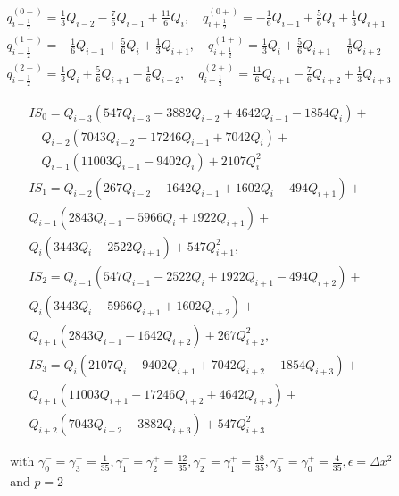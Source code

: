 \begin{equation}
\begin{array}{ll}
q_{i+\frac{1}{2}}^{(0-)}  =\frac{1}{3} Q_{i-2}-\frac{7}{6} Q_{i-1}+\frac{11}{6} Q_{i},\quad  q_{i+\frac{1}{2}}^{(0+)}=-\frac{1}{6} Q_{i-1}+\frac{5}{6} Q_{i}+\frac{1}{3} Q_{i+1} \\
q_{i+\frac{1}{2}}^{(1-)}  =-\frac{1}{6} Q_{i-1}+\frac{5}{6} Q_{i}+\frac{1}{3} Q_{i+1}, \quad  q_{i+\frac{1}{2}}^{(1+)}=\frac{1}{3} Q_{i}+\frac{5}{6} Q_{i+1}-\frac{1}{6} Q_{i+2} \\
q_{i+\frac{1}{2}}^{(2-)}  =\frac{1}{3} Q_{i}+\frac{5}{6} Q_{i+1}-\frac{1}{6} Q_{i+2}, \quad q_{i-\frac{1}{2}}^{(2+)}=\frac{11}{6} Q_{i+1}-\frac{7}{6} Q_{i+2}+\frac{1}{3} Q_{i+3}
\end{array}
\end{equation}

\begin{equation}
\begin{array}{c}
I S_{0}=Q_{i-3}\left(547 Q_{i-3}-3882 Q_{i-2}+4642 Q_{i-1}-1854 Q_{i}\right)+ \\
\quad Q_{i-2}\left(7043 Q_{i-2}-17246 Q_{i-1}+7042 Q_{i}\right)+ \\
\quad Q_{i-1}\left(11003 Q_{i-1}-9402 Q_{i}\right)+2107 Q_{i}^{2} \\
I S_{1}=  Q_{i-2}\left(267 Q_{i-2}-1642 Q_{i-1}+1602 Q_{i}-494 Q_{i+1}\right)+ \\
Q_{i-1}\left(2843 Q_{i-1}-5966 Q_{i}+1922 Q_{i+1}\right)+ \\
Q_{i}\left(3443 Q_{i}-2522 Q_{i+1}\right)+547 Q_{i+1}^{2}, \\
I S_{2}=  Q_{i-1}\left(547 Q_{i-1}-2522 Q_{i}+1922 Q_{i+1}-494 Q_{i+2}\right)+ \\
Q_{i}\left(3443 Q_{i}-5966 Q_{i+1}+1602 Q_{i+2}\right)+ \\
Q_{i+1}\left(2843 Q_{i+1}-1642 Q_{i+2}\right)+267 Q_{i+2}^{2}, \\
IS_{3}=  Q_{i}\left(2107 Q_{i}-9402 Q_{i+1}+7042 Q_{i+2}-1854 Q_{i+3}\right)+ \\
Q_{i+1}\left(11003 Q_{i+1}-17246 Q_{i+2}+4642 Q_{i+3}\right)+ \\
Q_{i+2}\left(7043 Q_{i+2}-3882 Q_{i+3}\right)+547 Q_{i+3}^{2}
\end{array}
\end{equation}

\begin{equation}
\begin{array}{l}
\text { with } \gamma_{0}^{-}=\gamma_{3}^{+}=\frac{1}{35}, \gamma_{1}^{-}=\gamma_{2}^{+}=\frac{12}{35}, \gamma_{2}^{-}=\gamma_{1}^{+}=\frac{18}{35}, \gamma_{3}^{-}=\gamma_{0}^{+}=\frac{4}{35}, \epsilon=\Delta x^{2} \\
\text { and } p=2
\end{array}
\end{equation}

